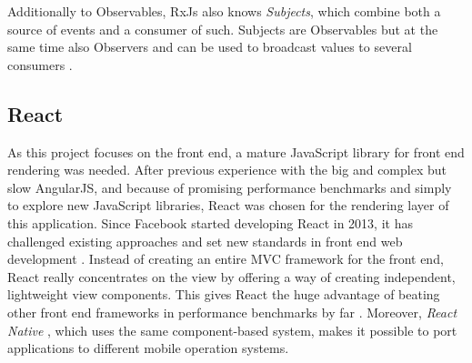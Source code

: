 Additionally to Observables, RxJs also knows \emph{Subjects}, which combine both a source of events and a consumer of such. Subjects are Observables but at the same time also Observers and can be used to broadcast values to several consumers \cite{rxjs}.

\subsection{React}
\label{sec:implementation-technologies-react}

As this project focuses on the front end, a mature JavaScript library for front end rendering was needed. After previous experience with the big and complex but slow AngularJS, and because of promising performance benchmarks \cite{react-benchmarks} and simply to explore new JavaScript libraries, React was chosen for the rendering layer of this application. Since Facebook started developing React in 2013, it has challenged existing approaches and set new standards in front end web development \cite{introduction-to-react}. Instead of creating an entire MVC framework for the front end, React really concentrates on the view by offering a way of creating independent, lightweight view components. This gives React the huge advantage of beating other front end frameworks in performance benchmarks by far \cite{react-benchmarks}. Moreover, \emph{React Native} \cite{react-native}, which uses the same component-based system, makes it possible to port applications to different mobile operation systems.

